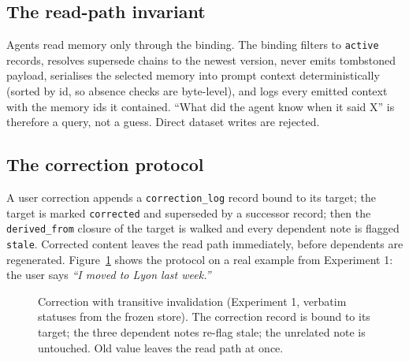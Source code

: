 \documentclass[11pt]{article}
\begin{document}
\subsection{The read-path invariant}
Agents read memory only through the binding. The binding filters to \texttt{active} records, resolves supersede chains to the newest version, never emits tombstoned payload, serialises the selected memory into prompt context deterministically (sorted by id, so absence checks are byte-level), and logs every emitted context with the memory ids it contained. ``What did the agent know when it said X'' is therefore a query, not a guess. Direct dataset writes are rejected.

\subsection{The correction protocol}
A user correction appends a \texttt{correction\_log} record bound to its target; the target is marked \texttt{corrected} and superseded by a successor record; then the \texttt{derived\_from} closure of the target is walked and every dependent note is flagged \texttt{stale}. Corrected content leaves the read path immediately, before dependents are regenerated. Figure~\ref{fig:corr} shows the protocol on a real example from Experiment 1: the user says \emph{``I moved to Lyon last week.''}

\begin{figure}[t]
\centering
{}
\caption{Correction with transitive invalidation (Experiment 1, verbatim statuses from the frozen store). The correction record is bound to its target; the three dependent notes re-flag stale; the unrelated note is untouched. Old value leaves the read path at once.}
\label{fig:corr}
\end{figure}
\end{document}
